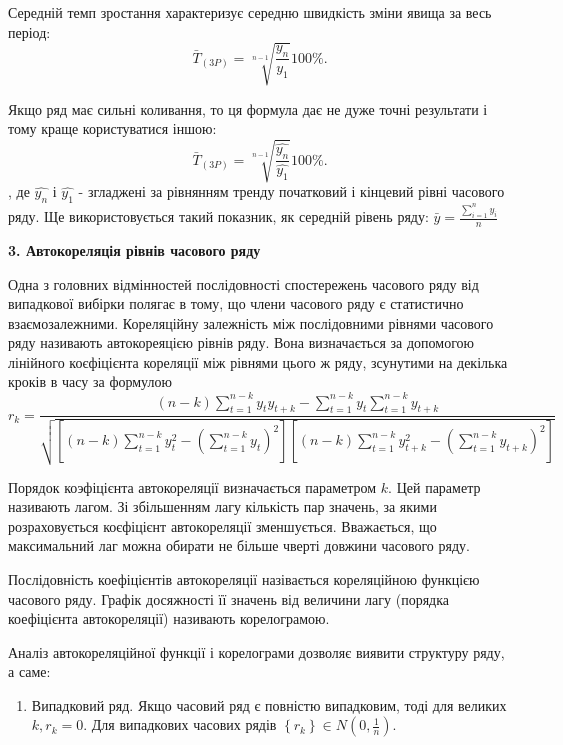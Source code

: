 \documentclass[a4paper, fontsize=14pt, oneside]{scrartcl}
\begin{document}
       Середній темп зростання характеризує середню швидкість зміни явища за весь період: \[ \bar{T}_{(3P)} = \sqrt[n-1]{\frac{y_{n}}{y_{1}}} 100\%. \]
       
       Якщо ряд має сильні коливання, то ця формула дає не дуже точні результати і тому краще користуватися іншою: \[ \bar{T}_{(3P)} = \sqrt[n-1]{\frac{\widehat{y_{n}}}{\widehat{y_{1}}}} 100\%. \], де $\widehat{y_{n}}$ і $\widehat{y_{1}}$ - згладжені за рівнянням тренду початковий і кінцевий рівні часового ряду.
       Ще використовується такий показник, як середній рівень ряду: $ \bar{y} = \frac{\sum\limits_{i=1}^{n} y_{i}}{n} $
       

\newpage

       \begin{center}
		\Large{\textbf{3. Автокореляція рівнів часового ряду}}
		\end{center}
        
        Одна з головних відмінностей послідовності спостережень часового ряду від випадкової вибірки полягає в тому, що члени часового ряду є статистично взаємозалежними. Кореляційну залежність між послідовними рівнями часового ряду називають автокореяцією рівнів ряду. Вона визначається за допомогою лінійного коєфіцієнта кореляції між рівнями цього ж ряду, зсунутими на декілька кроків в часу за формулою \[ r_{k} = \frac{(n-k)\sum\limits_{t=1}^{n-k}y_{t}y_{t+k} - \sum\limits_{t=1}^{n-k}y_{t} \sum\limits_{t=1}^{n-k}y_{t+k}}{\sqrt{[(n-k) \sum\limits_{t=1}^{n-k}y_{t}^{2} - (\sum\limits_{t=1}^{n-k}y_{t})^{2}][(n-k)\sum\limits_{t=1}^{n-k}y_{t+k}^{2} - (\sum\limits_{t=1}^{n-k}y_{t+k})^{2}]}} \]
        
        Порядок коэфіцієнта автокореляції визначається параметром $k$. Цей параметр називають лагом. Зі збільшенням лагу кількість пар значень, за якими розраховується коєфіцієнт автокореляції зменшується. Вважається, що максимальний лаг можна обирати не більше чверті довжини часового ряду. 
        
        Послідовність коефіцієнтів автокореляції назівається кореляційною функцією часового ряду. Графік досяжності її значень від величини лагу (порядка коефіцієнта автокореляції) називають корелограмою.
        
        Аналіз автокореляційної функції і корелограми дозволяє виявити структуру ряду, а саме:
        \begin{enumerate}
			\item  Випадковий ряд. Якщо часовий ряд є повністю випадковим, тоді для великих $k, r_{k} = 0 $. Для випадкових часових рядів $\left\{ r_{k} \right \} \in N(0, \frac{1}{n})$.
		\end{enumerate}
        
\end{document}
